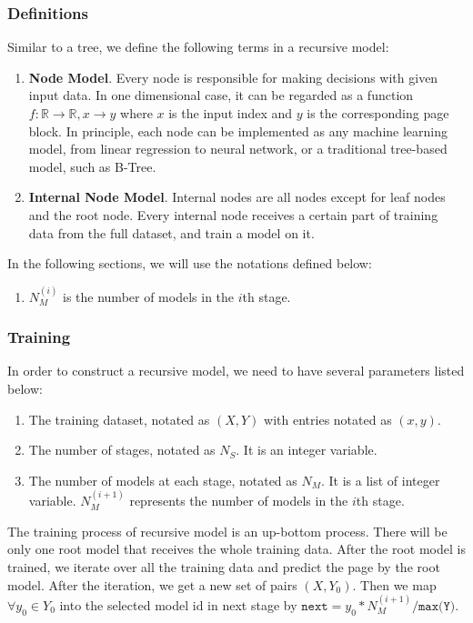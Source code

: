 \subsubsection{Definitions}

Similar to a tree, we define the following terms in a recursive model:

\begin{enumerate}
	\item \textbf{Node Model}. Every node is responsible for making decisions with given input data. In one dimensional case, it can be regarded as a function $f:\mathbb{R}\to\mathbb{R}, x\to y$ where $x$ is the input index and $y$ is the corresponding page block. In principle, each node can be implemented as any machine learning model, from linear regression to neural network, or a traditional tree-based model, such as B-Tree.
	\item \textbf{Internal Node Model}. Internal nodes are all nodes except for leaf nodes and the root node. Every internal node receives a certain part of training data from the full dataset, and train a model on it. 
\end{enumerate}

In the following sections, we will use the notations defined below:
\begin{enumerate}
	\item $N_M^{(i)}$ is the number of models in the $i$th stage.
\end{enumerate}


\subsubsection{Training}

In order to construct a recursive model, we need to have several parameters listed below:
\begin{enumerate}
	\item The training dataset, notated as $(X, Y)$ with entries notated as $(x,y)$.
	\item The number of stages, notated as $N_S$. It is an integer variable.
	\item The number of models at each stage, notated as $N_M$. It is a list of integer variable. $N_M^{(i+1)}$ represents the number of models in the $i$th stage.
\end{enumerate}

The training process of recursive model is an up-bottom process. There will be only one root model that receives the whole training data. After the root model is trained, we iterate over all the training data and predict the page by the root model. After the iteration, we get a new set of pairs $(X, Y_0)$. Then we map $\forall y_0\in Y_0$ into the selected model id in next stage by $\texttt{next}=y_0 * N_M^{(i+1)}/\texttt{max(Y)}$.

